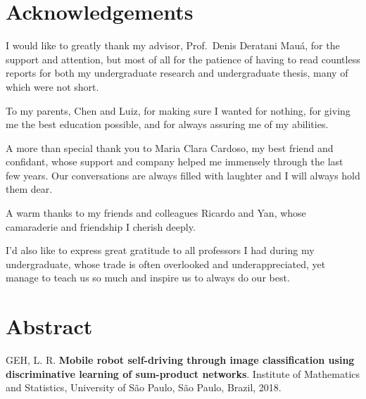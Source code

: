 \chapter*{Acknowledgements}

I would like to greatly thank my advisor, Prof.\ Denis Deratani Mauá, for the support and
attention, but most of all for the patience of having to read countless reports for both my
undergraduate research and undergraduate thesis, many of which were not short.

To my parents, Chen and Luiz, for making sure I wanted for nothing, for giving me the best
education possible, and for always assuring me of my abilities.

A more than special thank you to Maria Clara Cardoso, my best friend and confidant, whose support
and company helped me immensely through the last few years. Our conversations are always filled
with laughter and I will always hold them dear.

A warm thanks to my friends and colleagues Ricardo and Yan, whose camaraderie and friendship I
cherish deeply.

I'd also like to express great gratitude to all professors I had during my undergraduate, whose
trade is often overlooked and underappreciated, yet manage to teach us so much and inspire us to
always do our best.

\vfill
{}

\chapter*{Abstract}

\noindent GEH, L. R. \textbf{Mobile robot self-driving through image classification using
  discriminative learning of sum-product networks}. Institute of Mathematics and Statistics,
University of São Paulo, São Paulo, Brazil, 2018.\\

